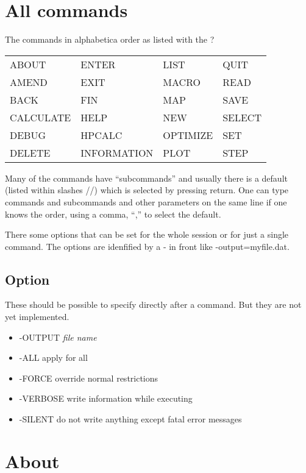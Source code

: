 \documentclass[12pt]{article}
\begin{document}
\section{All commands}

The commands in alphabetica order as listed with the ?

\begin{tabular}{llll}
ABOUT           & ENTER           & LIST           & QUIT    \\
AMEND           & EXIT            & MACRO          & READ    \\
BACK            & FIN             & MAP            & SAVE    \\
CALCULATE       & HELP            & NEW            & SELECT  \\
DEBUG           & HPCALC          & OPTIMIZE       & SET    \\
DELETE          & INFORMATION     & PLOT           & STEP     \\
\end{tabular}

Many of the commands have ``subcommands'' and usually there is a
default (listed within slashes //) which is selected by pressing
return.  One can type commands and subcommands and other parameters on
the same line if one knows the order, using a comma, ``,'' to select
the default.

There some options that can be set for the whole session or for just a
single command.  The options are idenfified by a - in front like
-output=myfile.dat.

\subsection{Option}

These should be possible to specify directly after a command.  But
they are not yet implemented.

\begin{itemize}
\item -OUTPUT {\em file name}
\item -ALL apply for all
\item -FORCE override normal restrictions
\item -VERBOSE write information while executing
\item -SILENT do not write anything except fatal error messages
\end{itemize}
\section{About}
\end{document}
